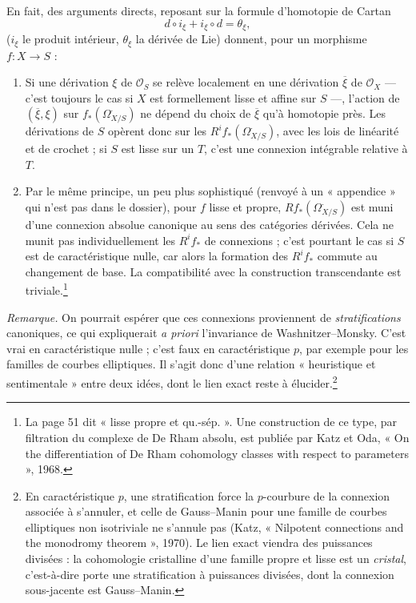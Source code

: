\documentclass[11pt,a4paper]{article}
\begin{document}
En fait, des arguments directs, reposant sur la formule d'homotopie de
Cartan
\[
  d \circ i_\xi + i_\xi \circ d = \theta_\xi ,
\]
($i_\xi$ le produit intérieur, $\theta_\xi$ la dérivée de Lie) donnent, pour
un morphisme $f : X \to S$ :
\begin{enumerate}
\item[(i)] Si une dérivation $\xi$ de $\mathcal{O}_S$ se relève localement en
  une dérivation $\overline{\xi}$ de $\mathcal{O}_X$ — c'est toujours le cas si
  $X$ est formellement lisse et affine sur $S$ —, l'action de
  $(\overline{\xi}, \xi)$ sur $f_{*}(\Omega^{\cdot}_{X/S})$ ne dépend du choix
  de $\overline{\xi}$ qu'à homotopie près. Les dérivations de $S$ opèrent donc
  sur les $R^{i}f_{*}(\Omega^{\cdot}_{X/S})$, avec les lois de linéarité et
  de crochet ; si $S$ est lisse sur un $T$, c'est une connexion intégrable
  relative à $T$.
\item[(ii)] Par le même principe, un peu plus sophistiqué (renvoyé à un
  « appendice » qui n'est pas dans le dossier), pour $f$ lisse et propre,
  $Rf_{*}(\Omega^{\cdot}_{X/S})$ est muni d'une connexion absolue canonique au
  sens des catégories dérivées. Cela ne munit pas individuellement les
  $R^{i}f_{*}$ de connexions ; c'est pourtant le cas si $S$ est de
  caractéristique nulle, car alors la formation des $R^{i}f_{*}$ commute au
  changement de base. La compatibilité avec la construction transcendante est
  triviale.\footnote{La page 51 dit « lisse propre et qu.-sép. ». Une
  construction de ce type, par filtration du complexe de De Rham absolu, est
  publiée par Katz et Oda, « On the differentiation of De Rham cohomology
  classes with respect to parameters », 1968.}
\end{enumerate}

\emph{Remarque.} On pourrait espérer que ces connexions proviennent de
\emph{stratifications} canoniques, ce qui expliquerait \emph{a priori}
l'invariance de Washnitzer--Monsky. C'est vrai en caractéristique nulle ;
c'est faux en caractéristique $p$, par exemple pour les familles de courbes
elliptiques. Il s'agit donc d'une relation « heuristique et sentimentale »
entre deux idées, dont le lien exact reste à élucider.\footnote{En
caractéristique $p$, une stratification force la $p$-courbure de la connexion
associée à s'annuler, et celle de Gauss--Manin pour une famille de courbes
elliptiques non isotriviale ne s'annule pas (Katz, « Nilpotent connections and
the monodromy theorem », 1970). Le lien exact viendra des puissances
divisées : la cohomologie cristalline d'une famille propre et lisse est un
\emph{cristal}, c'est-à-dire porte une stratification à puissances divisées,
dont la connexion sous-jacente est Gauss--Manin.}
\end{document}
